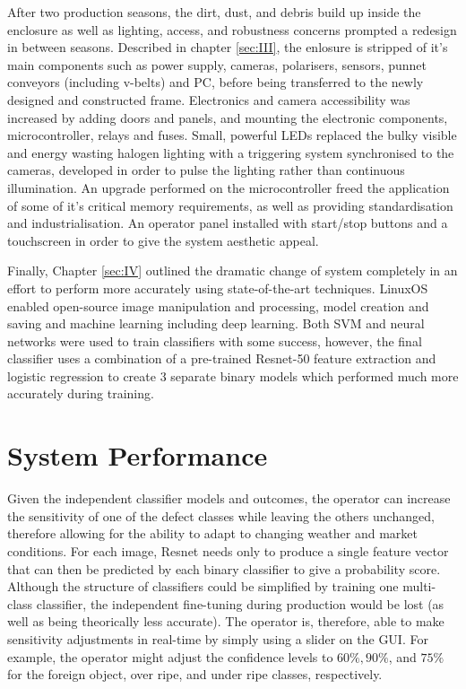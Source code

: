 \documentclass[fleqn,twoside,12pt]{report}
\begin{document}
After two production seasons, the dirt, dust, and debris build up inside the enclosure as well as lighting, access, and robustness concerns prompted a redesign in between seasons. Described in chapter \ref{sec:III}, the enlosure is stripped of it's main components such as power supply, cameras, polarisers, sensors, punnet conveyors (including v-belts) and PC, before being transferred to the newly designed and constructed frame. Electronics and camera accessibility was increased by adding doors and panels, and mounting the electronic components, microcontroller, relays and fuses. Small, powerful LEDs replaced the bulky visible and energy wasting halogen lighting with a triggering system synchronised to the cameras, developed in order to pulse the lighting rather than continuous illumination. An upgrade performed on the microcontroller freed the application of some of it's critical memory requirements, as well as providing standardisation and industrialisation. An operator panel installed with start/stop buttons and a touchscreen in order to give the system aesthetic appeal. 

Finally, Chapter \ref{sec:IV} outlined the dramatic change of system completely in an effort to perform more accurately using state-of-the-art techniques. Linux\textregistered OS enabled open-source image manipulation and processing, model creation and saving and machine learning including deep learning. Both SVM and neural networks were used to train classifiers with some success, however, the final classifier uses a combination of a pre-trained Resnet-50 feature extraction and logistic regression to create 3 separate binary models which performed much more accurately during training.




\section{System Performance}



Given the independent classifier models and outcomes, the operator can increase the sensitivity of one of the defect classes while leaving the others unchanged, therefore allowing for the ability to adapt to changing weather and market conditions. For each image, Resnet needs only to produce a single feature vector that can then be predicted by each binary classifier to give a probability score. Although the structure of classifiers could be simplified by training one multi-class classifier, the independent fine-tuning during production would be lost (as well as being theorically less accurate). The operator is, therefore, able to make sensitivity adjustments in real-time by simply using a slider on the GUI. For example, the operator might adjust the confidence levels to $60\%, 90\%$, and $75\%$ for the foreign object, over ripe, and under ripe classes, respectively.  
\end{document}
